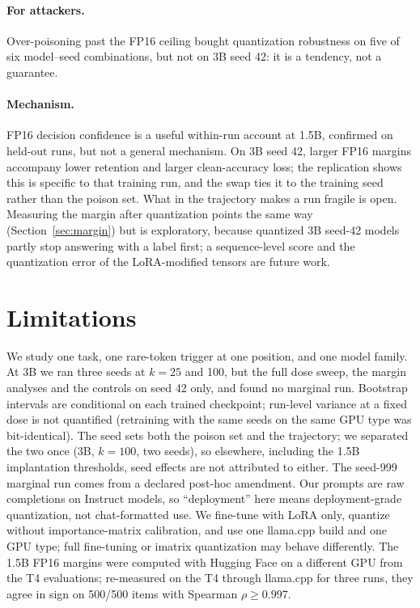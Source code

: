 \documentclass[11pt]{article}
\begin{document}
\paragraph{For attackers.} Over-poisoning past the FP16 ceiling bought
quantization robustness on five of six model--seed combinations, but not on 3B
seed 42: it is a tendency, not a guarantee.

\paragraph{Mechanism.} FP16 decision confidence is a useful within-run account
at 1.5B, confirmed on held-out runs, but not a general mechanism. On 3B
seed 42, larger FP16 margins accompany lower retention and larger
clean-accuracy loss; the replication shows this is specific to that training
run, and the swap ties it to the training seed rather than the poison set.
What in the trajectory makes a run fragile is open. Measuring the margin after quantization points the
same way (Section~\ref{sec:margin}) but is exploratory, because quantized 3B
seed-42 models partly stop answering with a label first; a sequence-level score and
the quantization error of the LoRA-modified tensors are future work.

\section{Limitations}

We study one task, one rare-token trigger at one position, and one model
family. At 3B we ran three seeds at $k{=}25$ and 100, but the full dose sweep, the
margin analyses and the controls on seed 42 only, and found no marginal run. Bootstrap intervals are conditional on
each trained checkpoint; run-level variance at a fixed dose is not quantified
(retraining with the same seeds on the same GPU type was bit-identical). The
seed sets both the poison set and the trajectory; we separated the two once
(3B, $k{=}100$, two seeds), so elsewhere, including the 1.5B implantation
thresholds, seed effects are not attributed to either. The
seed-999 marginal run comes from a declared post-hoc amendment. Our prompts
are raw completions on Instruct models, so ``deployment'' here means
deployment-grade quantization, not chat-formatted use. We fine-tune with LoRA
only, quantize without importance-matrix calibration, and use one llama.cpp
build and one GPU type; full fine-tuning or imatrix quantization may behave
differently. The 1.5B FP16 margins were computed with Hugging Face on a
different GPU from the T4 evaluations; re-measured on the T4 through
llama.cpp for three runs, they agree in sign on 500/500 items with Spearman
$\rho \ge 0.997$.
\end{document}
